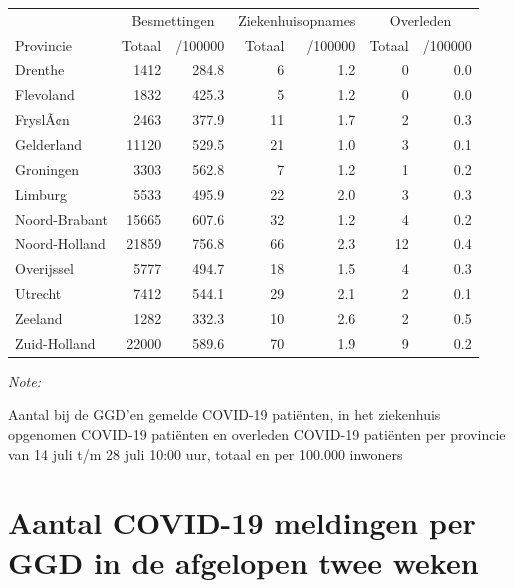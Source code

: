 \documentclass[
  english,
  man,floatsintext]{apa6}
\begin{document}
\begin{table}
\centering
\begin{threeparttable}
\begin{tabular}{lrrrrrr}
\toprule
\multicolumn{1}{c}{ } & \multicolumn{2}{c}{Besmettingen} & \multicolumn{2}{c}{Ziekenhuisopnames} & \multicolumn{2}{c}{Overleden} \\
\cmidrule(l{3pt}r{3pt}){2-3} \cmidrule(l{3pt}r{3pt}){4-5} \cmidrule(l{3pt}r{3pt}){6-7}
Provincie & Totaal & /100000 & Totaal & /100000 & Totaal & /100000\\
\midrule
Drenthe & 1412 & 284.8 & 6 & 1.2 & 0 & 0.0\\
Flevoland & 1832 & 425.3 & 5 & 1.2 & 0 & 0.0\\
FryslÃ¢n & 2463 & 377.9 & 11 & 1.7 & 2 & 0.3\\
Gelderland & 11120 & 529.5 & 21 & 1.0 & 3 & 0.1\\
Groningen & 3303 & 562.8 & 7 & 1.2 & 1 & 0.2\\
Limburg & 5533 & 495.9 & 22 & 2.0 & 3 & 0.3\\
Noord-Brabant & 15665 & 607.6 & 32 & 1.2 & 4 & 0.2\\
Noord-Holland & 21859 & 756.8 & 66 & 2.3 & 12 & 0.4\\
Overijssel & 5777 & 494.7 & 18 & 1.5 & 4 & 0.3\\
Utrecht & 7412 & 544.1 & 29 & 2.1 & 2 & 0.1\\
Zeeland & 1282 & 332.3 & 10 & 2.6 & 2 & 0.5\\
Zuid-Holland & 22000 & 589.6 & 70 & 1.9 & 9 & 0.2\\
\bottomrule
\end{tabular}
\begin{tablenotes}
\item \textit{Note: } 
\item Aantal bij de GGD’en gemelde COVID-19 patiënten, in het ziekenhuis opgenomen COVID-19 patiënten en overleden COVID-19 patiënten per provincie van 14 juli t/m 28 juli 10:00 uur, totaal en per 100.000 inwoners
\end{tablenotes}
\end{threeparttable}
\end{table}

\newpage

\hypertarget{aantal-covid-19-meldingen-per-ggd-in-de-afgelopen-twee-weken}{%
\section{Aantal COVID-19 meldingen per GGD in de afgelopen twee weken}\label{aantal-covid-19-meldingen-per-ggd-in-de-afgelopen-twee-weken}}
\end{document}
